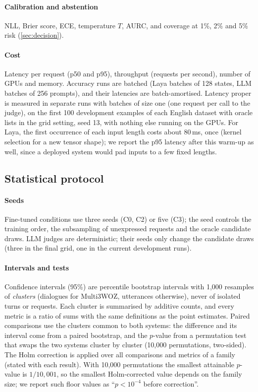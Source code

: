 \paragraph{Calibration and abstention} NLL, Brier score, ECE, temperature $T$, AURC, and coverage at 1\%, 2\% and 5\% risk (\cref{sec:decision}).

\paragraph{Cost} Latency per request (p50 and p95), throughput (requests per second), number of GPUs and memory. Accuracy runs are batched (Laya batches of 128 states, LLM batches of 256 prompts), and their latencies are batch-amortised. Latency proper is measured in separate runs with batches of size one (one request per call to the judge), on the first 100 development examples of each English dataset with oracle lists in the grid setting, seed 13, with nothing else running on the GPUs. For Laya, the first occurrence of each input length costs about 80\,ms, once (kernel selection for a new tensor shape); we report the p95 latency after this warm-up as well, since a deployed system would pad inputs to a few fixed lengths.

\subsection{Statistical protocol}
\label{sec:stats}

\paragraph{Seeds} Fine-tuned conditions use three seeds (C0, C2) or five (C3); the seed controls the training order, the subsampling of unexpressed requests and the oracle candidate draws. LLM judges are deterministic; their seeds only change the candidate draws (three in the final grid, one in the current development runs).

\paragraph{Intervals and tests} Confidence intervals (95\%) are percentile bootstrap intervals with 1,000 resamples of \emph{clusters} (dialogues for Multi3WOZ, utterances otherwise), never of isolated turns or requests. Each cluster is summarised by additive counts, and every metric is a ratio of sums with the same definitions as the point estimates. Paired comparisons use the clusters common to both systems: the difference and its interval come from a paired bootstrap, and the $p$-value from a permutation test that swaps the two systems cluster by cluster (10,000 permutations, two-sided). The Holm correction is applied over all comparisons and metrics of a family (stated with each result). With 10,000 permutations the smallest attainable $p$-value is $1/10{,}001$, so the smallest Holm-corrected value depends on the family size; we report such floor values as ``$p<10^{-4}$ before correction''.

